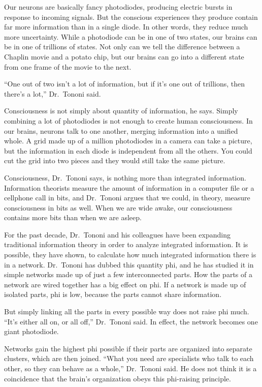 ﻿\documentclass[12pt]{article}
\begin{document}
Our neurons are basically fancy photodiodes, producing electric bursts in response to incoming
signals. But the conscious experiences they produce contain far more information than in a single
diode. In other words, they reduce much more uncertainty. While a photodiode can be in one of two
states, our brains can be in one of trillions of states. Not only can we tell the difference between
a Chaplin movie and a potato chip, but our brains can go into a different state from one frame of
the movie to the next.

``One out of two isn't a lot of information, but if it's one out of trillions, then there's a lot,''
Dr.~Tononi said.

Consciousness is not simply about quantity of information, he says. Simply combining a lot of
photodiodes is not enough to create human consciousness. In our brains, neurons talk to one another,
merging information into a unified whole. A grid made up of a million photodiodes in a camera can
take a picture, but the information in each diode is independent from all the others. You could cut
the grid into two pieces and they would still take the same picture.

Consciousness, Dr.~Tononi says, is nothing more than integrated information. Information theorists
measure the amount of information in a computer file or a cellphone call in bits, and Dr.~Tononi
argues that we could, in theory, measure consciousness in bits as well. When we are wide awake, our
consciousness contains more bits than when we are asleep.

For the past decade, Dr.~Tononi and his colleagues have been expanding traditional information
theory in order to analyze integrated information. It is possible, they have shown, to calculate how
much integrated information there is in a network. Dr.~Tononi has dubbed this quantity phi, and he
has studied it in simple networks made up of just a few interconnected parts. How the parts of a
network are wired together has a big effect on phi. If a network is made up of isolated parts, phi
is low, because the parts cannot share information.

But simply linking all the parts in every possible way does not raise phi much. ``It's either all
on, or all off,'' Dr.~Tononi said. In effect, the network becomes one giant photodiode.

Networks gain the highest phi possible if their parts are organized into separate clusters, which
are then joined. ``What you need are specialists who talk to each other, so they can behave as a
whole,'' Dr.~Tononi said. He does not think it is a coincidence that the brain's organization obeys
this phi-raising principle.
\end{document}
